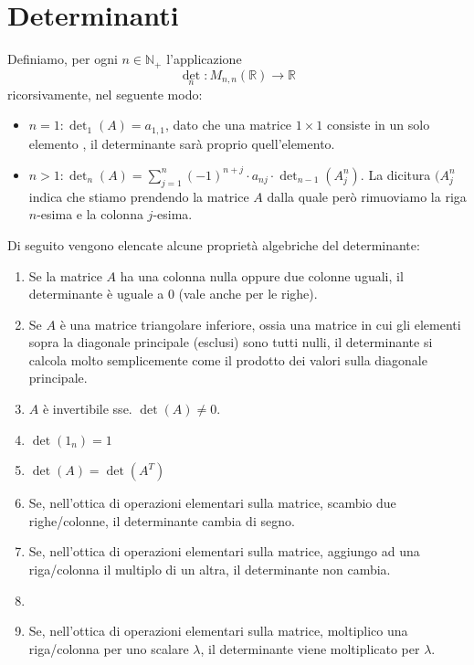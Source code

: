 \documentclass[12pt]{report}
\newcommand{\N}{\mathbb{N}}
\newcommand{\R}{\mathbb{R}}
\begin{document}
	\newpage
	\section{Determinanti}
	Definiamo, per ogni $n \in \N_+$ l'applicazione
	\[
		\det_n: M_{n,n}(\R) \to \R
	\]
	ricorsivamente, nel seguente modo:
	\begin{itemize}
		\item $n = 1: \det_1(A) = a_{1,1}$, dato che una matrice $1 \times 1$ consiste in un solo elemento , il determinante sarà proprio quell'elemento.
		\item $n > 1: \det_n(A) = \sum_{j=1}^{n} (-1)^{n+j} \cdot a_{nj} \cdot \det_{n-1}(A^{n}_{j})$.
		La dicitura $(A^{n}_{j}$ indica che stiamo prendendo la matrice $A$ dalla quale però rimuoviamo la riga $n$-esima e la colonna $j$-esima.
	\end{itemize}
	
	Di seguito vengono elencate alcune proprietà algebriche del determinante:
	\begin{enumerate}
		\item Se la matrice $A$ ha una colonna nulla oppure due colonne uguali, il determinante è uguale a $0$ (vale anche per le righe).
		\item Se $A$ è una matrice triangolare inferiore, ossia una matrice in cui gli elementi sopra la diagonale principale (esclusi) sono tutti nulli, il determinante si calcola molto semplicemente come il prodotto dei valori sulla diagonale principale.
		\item $A$ è invertibile sse. $\det(A) \neq 0$.
		\item $\det(1_n) = 1$
		\item $\det(A) = \det(A^T)$
		\item Se, nell'ottica di operazioni elementari sulla matrice, scambio due righe/colonne, il determinante cambia di segno.
		\item Se, nell'ottica di operazioni elementari sulla matrice, aggiungo ad una riga/colonna il multiplo di un altra, il determinante non cambia.
		\item \item Se, nell'ottica di operazioni elementari sulla matrice, moltiplico una riga/colonna per uno scalare $\lambda$, il determinante viene moltiplicato per $\lambda$.
	\end{enumerate}
	
	\newpage
\end{document}
